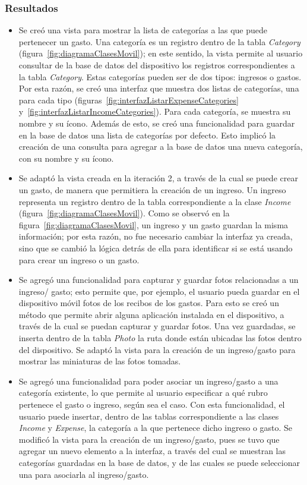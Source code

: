 \subsubsection{Resultados}
\begin{itemize}
\item Se creó una vista para mostrar la lista de categorías a las que puede pertenecer un gasto. Una categoría es un registro dentro de la tabla \textit{Category} (figura~\ref{fig:diagramaClasesMovil}); en este sentido, la vista permite al usuario consultar de la base de datos del dispositivo los registros correspondientes a la tabla \textit{Category}. Estas categorías pueden ser de dos tipos: ingresos o gastos. Por esta razón, se creó una interfaz que muestra dos listas de categorías, una para cada tipo (figuras~\ref{fig:interfazListarExpenseCategories} y~\ref{fig:interfazListarIncomeCategories}). Para cada categoría, se muestra su nombre y su ícono. Además de esto, se creó una funcionalidad para guardar en la base de datos una lista de categorías por defecto. Esto implicó la creación de una consulta para agregar a la base de datos una nueva categoría, con su nombre y su ícono.
\item Se adaptó la vista creada en la iteración 2, a través de la cual se puede crear un gasto, de manera que permitiera la creación de un ingreso. Un ingreso representa un registro dentro de la tabla correspondiente a la clase \textit{Income} (figura~\ref{fig:diagramaClasesMovil}). Como se observó en la figura~\ref{fig:diagramaClasesMovil}, un ingreso y un gasto guardan la misma información; por esta razón, no fue necesario cambiar la interfaz ya creada, sino que se cambió la lógica detrás de ella para identificar si se está usando para crear un ingreso o un gasto.
\item Se agregó una funcionalidad para capturar y guardar fotos relacionadas a un ingreso/ gasto; esto permite que, por ejemplo, el usuario pueda guardar en el dispositivo móvil fotos de los recibos de los gastos. Para esto se creó un método que permite abrir alguna aplicación instalada en el dispositivo, a través de la cual se puedan capturar y guardar fotos. Una vez guardadas, se inserta dentro de la tabla \textit{Photo} la ruta donde están ubicadas las fotos dentro del dispositivo. Se adaptó la vista para la creación de un ingreso/gasto para mostrar las miniaturas de las fotos tomadas.%
\item Se agregó una funcionalidad para poder asociar un ingreso/gasto a una categoría existente, lo que permite al usuario especificar a qué rubro pertenece el gasto o ingreso, según sea el caso. Con esta funcionalidad, el usuario puede insertar, dentro de las tablas correspondiente a las clases \textit{Income} y \textit{Expense}, la categoría a la que pertenece dicho ingreso o gasto. Se modificó la vista para la creación de un ingreso/gasto, pues se tuvo que agregar un nuevo elemento a la interfaz, a través del cual se muestran las categorías guardadas en la base de datos, y de las cuales se puede seleccionar una para asociarla al ingreso/gasto.


\end{itemize}
